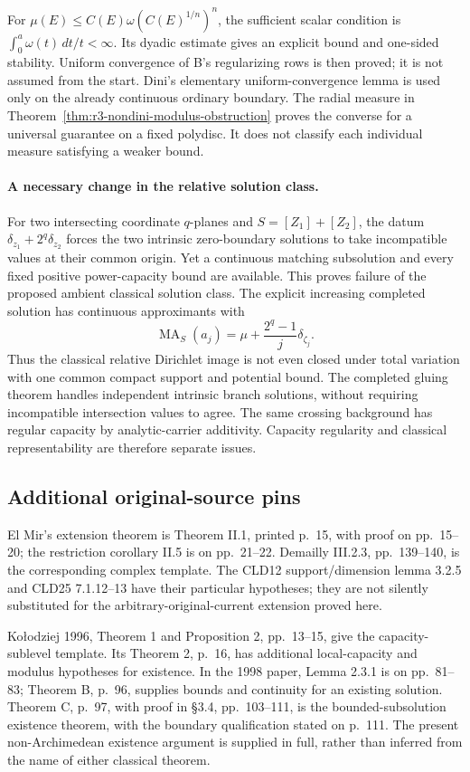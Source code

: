 \documentclass[11pt,a4paper]{article}
\numberwithin{equation}{section}
\theoremstyle{definition}
\theoremstyle{remark}
\begin{document}
For $\mu(E)\leq C(E)\omega(C(E)^{1/n})^n$, the sufficient scalar
condition is $\int_0^a\omega(t)\,dt/t<\infty$. Its dyadic estimate
gives an explicit bound and one-sided stability. Uniform convergence
of B's regularizing rows is then proved; it is not assumed from the
start. Dini's elementary uniform-convergence lemma is used only on
the already continuous ordinary boundary. The radial measure in
Theorem~\ref{thm:r3-nondini-modulus-obstruction} proves the converse
for a universal guarantee on a fixed polydisc. It does not classify
each individual measure satisfying a weaker bound.

\paragraph{A necessary change in the relative solution class.}
For two intersecting coordinate $q$-planes and $S=[Z_1]+[Z_2]$,
the datum $\delta_{z_1}+2^q\delta_{z_2}$ forces the two intrinsic
zero-boundary solutions to take incompatible values at their common
origin. Yet a continuous matching subsolution and every fixed
positive power-capacity bound are available. This proves failure of
the proposed ambient classical solution class. The explicit increasing
completed solution has continuous approximants with
\[
 \operatorname{MA}_S(a_j)
   =\mu+\frac{2^q-1}{j}\delta_{\zeta_j}.
\]
Thus the classical relative Dirichlet image is not even closed under
total variation with one common compact support and potential bound.
The completed gluing theorem handles independent intrinsic branch
solutions, without requiring incompatible intersection values to agree.
The same crossing background has regular capacity by analytic-carrier
additivity. Capacity regularity and classical representability are
therefore separate issues.

\subsection{Additional original-source pins}

El Mir's extension theorem is Theorem II.1, printed p.~15,
with proof on pp.~15--20; the restriction corollary II.5 is on
pp.~21--22. Demailly III.2.3, pp.~139--140, is the corresponding
complex template. The CLD12 support/dimension lemma 3.2.5 and
CLD25 7.1.12--13 have their particular hypotheses; they are not
silently substituted for the arbitrary-original-current extension
proved here.\cite[II.1, II.5]{ElMir84}\cite[III.2.3]{Dem12}

Ko\l odziej 1996, Theorem 1 and Proposition 2, pp.~13--15, give
the capacity-sublevel template. Its Theorem 2, p.~16, has additional
local-capacity and modulus hypotheses for existence. In the 1998
paper, Lemma 2.3.1 is on pp.~81--83; Theorem B, p.~96, supplies
bounds and continuity for an existing solution. Theorem C, p.~97,
with proof in \S3.4, pp.~103--111, is the bounded-subsolution
existence theorem, with the boundary qualification stated on p.~111.
The present non-Archimedean existence argument is supplied in full,
rather than inferred from the name of either classical theorem.
\cite[Theorems 1--2]{Kol96}\cite[Theorems B--C]{Kol98}
\end{document}
